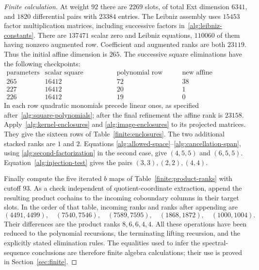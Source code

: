 \begin{proof}[Finite calculation]
At weight $92$ there are $2269$ slots, of total Ext dimension $6341$,
and $1820$ differential pairs with $23384$ entries.  The Leibniz
assembly uses $15453$ factor multiplication matrices, including
successive factors in~\eqref{alg:leibniz-constants}.  There are
$137471$ scalar zero and Leibniz equations, $110060$ of them having
nonzero augmented row.  Coefficient and augmented ranks are both
$23119$.  Thus the initial affine dimension is $265$.  The successive
square eliminations have the following checkpoints:
\[
\begin{array}{r|r|r|r}
 \text{parameters}&\text{scalar square equations}&
       \text{polynomial row rank}&\text{new affine restrictions}\\\hline
 265&16412&72&38\\
 227&16412&20&1\\
 226&16412&19&0
\end{array}
\]
In each row quadratic monomials precede linear ones, as specified
after~\eqref{alg:square-polynomials}; after the final refinement the affine
rank is $23158$.  Apply~\eqref{alg:kernel-enclosures} and
\eqref{alg:image-enclosures} to its projected matrices.  They give
the sixteen rows of Table~\ref{finite:enclosures}.  The two additional
stacked ranks are $1$ and $2$.  Equations
\eqref{alg:allowed-space}--\eqref{alg:cancellation-span}, using
\eqref{alg:second-factorization} in the second case, give
$(4,5,5)$ and $(6,5,5)$.  Equation~\eqref{alg:injection-test} gives
the pairs $(3,3),(2,2),(4,4)$.

Finally compute the five iterated $b$ maps of
Table~\ref{finite:product-ranks} with cutoff $93$.  As a check
independent of quotient-coordinate extraction, append the resulting
product cochains to the incoming coboundary columns in their target
slots.  In the order of that table, incoming ranks and ranks after
appending are
\[
 (4491,4499),\quad(7540,7546),\quad(7589,7595),\quad
 (1868,1872),\quad(1000,1004).
\]
Their differences are the product ranks $8,6,6,4,4$.
All these operations have been reduced to the polynomial recursions,
the terminating lifting recursion, and the explicitly stated
elimination rules.  The equalities used to infer the spectral-sequence
conclusions are therefore finite algebra calculations; their use is
proved in Section~\ref{sec:finite}.
\end{proof}

